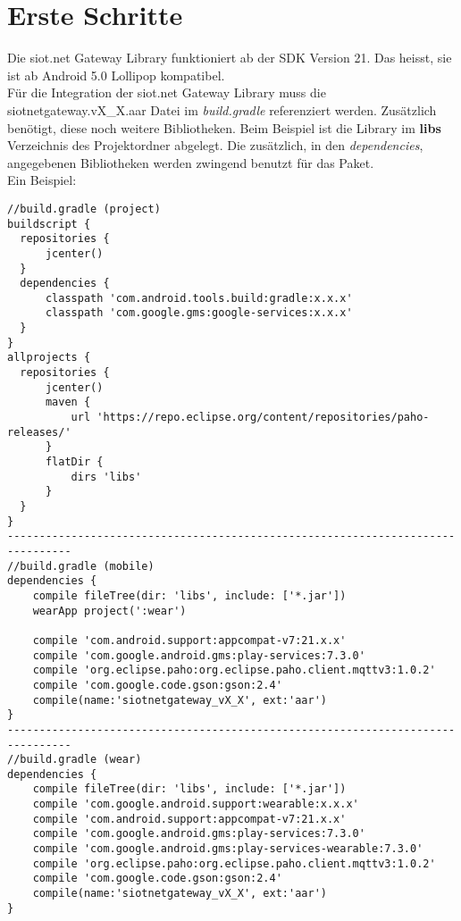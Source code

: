 \section{Erste Schritte}
Die siot.net Gateway Library funktioniert ab der SDK Version 21. Das heisst, sie ist ab Android 5.0 Lollipop kompatibel.\\
Für die Integration der siot.net Gateway Library muss die siotnetgateway.vX\_X.aar Datei im \textit{build.gradle} referenziert werden. Zusätzlich benötigt, diese noch weitere Bibliotheken. Beim Beispiel ist die Library im \textbf{libs} Verzeichnis des Projektordner abgelegt. Die zusätzlich, in den \textit{dependencies}, angegebenen Bibliotheken werden zwingend benutzt für das Paket.\\
Ein Beispiel:
\begin{lstlisting}
//build.gradle (project)
buildscript {
  repositories {
      jcenter()
  }
  dependencies {
      classpath 'com.android.tools.build:gradle:x.x.x'
      classpath 'com.google.gms:google-services:x.x.x'
  }
}
allprojects {
  repositories {
      jcenter()
      maven {
          url 'https://repo.eclipse.org/content/repositories/paho-releases/'
      }
      flatDir {
          dirs 'libs'
      }
  }
}
--------------------------------------------------------------------------------
//build.gradle (mobile)
dependencies {
    compile fileTree(dir: 'libs', include: ['*.jar'])
    wearApp project(':wear')

    compile 'com.android.support:appcompat-v7:21.x.x'
    compile 'com.google.android.gms:play-services:7.3.0'
    compile 'org.eclipse.paho:org.eclipse.paho.client.mqttv3:1.0.2'
    compile 'com.google.code.gson:gson:2.4'
    compile(name:'siotnetgateway_vX_X', ext:'aar')
}
--------------------------------------------------------------------------------
//build.gradle (wear)
dependencies {
    compile fileTree(dir: 'libs', include: ['*.jar'])
    compile 'com.google.android.support:wearable:x.x.x'
    compile 'com.android.support:appcompat-v7:21.x.x'
    compile 'com.google.android.gms:play-services:7.3.0'
    compile 'com.google.android.gms:play-services-wearable:7.3.0'
    compile 'org.eclipse.paho:org.eclipse.paho.client.mqttv3:1.0.2'
    compile 'com.google.code.gson:gson:2.4'
    compile(name:'siotnetgateway_vX_X', ext:'aar')
}
\end{lstlisting}
